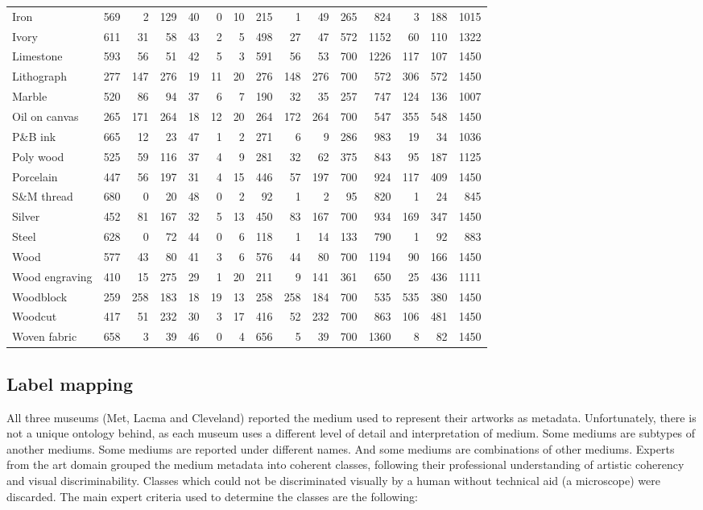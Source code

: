 \documentclass{article}
\begin{document}
\begin{table}[t]
\begin{tabular}{l|rrr|rrr|rrrr||rrrr}
Iron & 569 & 2 & 129 & 40 & 0 & 10 & 215 & 1 & 49 & 265 & 824 & 3 & 188 & 1015 \\
Ivory & 611 & 31 & 58 & 43 & 2 & 5 & 498 & 27 & 47 & 572 & 1152 & 60 & 110 & 1322 \\
Limestone & 593 & 56 & 51 & 42 & 5 & 3 & 591 & 56 & 53 & 700 & 1226 & 117 & 107 & 1450 \\
Lithograph & 277 & 147 & 276 & 19 & 11 & 20 & 276 & 148 & 276 & 700 & 572 & 306 & 572 & 1450 \\
Marble & 520 & 86 & 94 & 37 & 6 & 7 & 190 & 32 & 35 & 257 & 747 & 124 & 136 & 1007 \\
Oil on canvas & 265 & 171 & 264 & 18 & 12 & 20 & 264 & 172 & 264 & 700 & 547 & 355 & 548 & 1450 \\
P\&B ink & 665 & 12 & 23 & 47 & 1 & 2 & 271 & 6 & 9 & 286 & 983 & 19 & 34 & 1036 \\
Poly wood & 525 & 59 & 116 & 37 & 4 & 9 & 281 & 32 & 62 & 375 & 843 & 95 & 187 & 1125 \\
Porcelain & 447 & 56 & 197 & 31 & 4 & 15 & 446 & 57 & 197 & 700 & 924 & 117 & 409 & 1450 \\
S\&M thread & 680 & 0 & 20 & 48 & 0 & 2 & 92 & 1 & 2 & 95 & 820 & 1 & 24 & 845 \\
Silver & 452 & 81 & 167 & 32 & 5 & 13 & 450 & 83 & 167 & 700 & 934 & 169 & 347 & 1450 \\
Steel & 628 & 0 & 72 & 44 & 0 & 6 & 118 & 1 & 14 & 133 & 790 & 1 & 92 & 883 \\
Wood & 577 & 43 & 80 & 41 & 3 & 6 & 576 & 44 & 80 & 700 & 1194 & 90 & 166 & 1450 \\
Wood engraving & 410 & 15 & 275 & 29 & 1 & 20 & 211 & 9 & 141 & 361 & 650 & 25 & 436 & 1111 \\
Woodblock & 259 & 258 & 183 & 18 & 19 & 13 & 258 & 258 & 184 & 700 & 535 & 535 & 380 & 1450 \\
Woodcut & 417 & 51 & 232 & 30 & 3 & 17 & 416 & 52 & 232 & 700 & 863 & 106 & 481 & 1450 \\
Woven fabric & 658 & 3 & 39 & 46 & 0 & 4 & 656 & 5 & 39 & 700 & 1360 & 8 & 82 & 1450
\end{tabular} \end{table}

\subsection{Label mapping}

All three museums (Met, Lacma and Cleveland) reported the medium used to represent their artworks as metadata. Unfortunately, there is not a unique ontology behind, as each museum uses a different level of detail and interpretation of medium. Some mediums are subtypes of another mediums. Some mediums are reported under different names. And some mediums are combinations of other mediums. Experts from the art domain grouped the medium metadata into coherent classes, following their professional understanding of artistic coherency and visual discriminability. Classes which could not be discriminated visually by a human without technical aid (\eg a microscope) were discarded. The main expert criteria used to determine the classes are the following:
\end{document}
